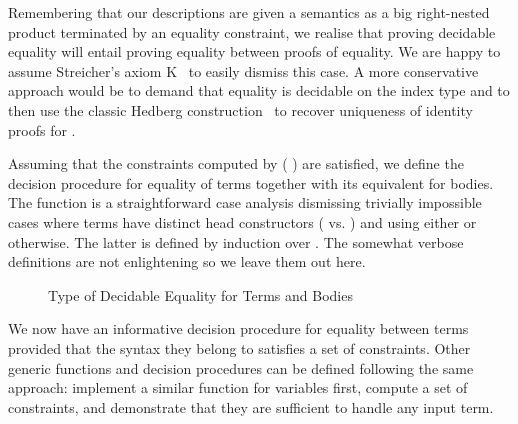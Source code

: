 Remembering that our descriptions are given a semantics as a big right-nested
product terminated by an equality constraint, we realise that proving decidable
equality will entail proving equality between proofs of equality. We are happy
to assume Streicher's axiom K~\cite{DBLP:conf/lics/HofmannS94} to easily
dismiss this case. A more conservative approach would be to demand that equality
is decidable on the index type  and to then use the classic Hedberg
construction~\cite{DBLP:journals/jfp/Hedberg98} to recover uniqueness of
identity proofs for .

Assuming that the constraints computed by {( )} are
satisfied, we define the decision procedure for equality of terms together
with its equivalent for bodies. The function 
is a straightforward case analysis dismissing trivially impossible cases
where terms have distinct head constructors ( vs. )
and using either  or 
otherwise. The latter is defined by induction over . The somewhat
verbose definitions are not enlightening so we leave them out here.

\begin{figure}[h]
\caption{Type of Decidable Equality for Terms and Bodies}\label{fig:eqtype}
\end{figure}

We now have an informative decision procedure for equality between terms
provided that the syntax they belong to satisfies a set of constraints.
Other generic functions and decision procedures can be defined
following the same approach: implement a similar function for variables
first, compute a set of constraints, and demonstrate that they are
sufficient to handle any input term.
